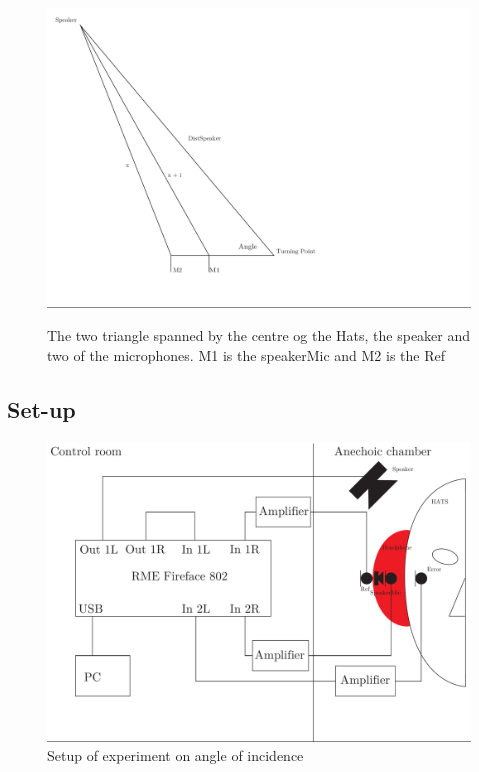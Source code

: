 \begin{figure}
	\includegraphics[width=\textwidth]{../Journal/Experiments/AngleOfIncidence/TriangleCalculation.pdf}
	\label{Fig:AngleOfIcidenceTriangleCalculation}
	\caption{The two triangle spanned by the centre og the Hats, the speaker and two of the microphones. M1 is the speakerMic and M2 is the Ref}
\end{figure}  


\subsection{Set-up}
\begin{figure}[H]
	\includegraphics[width=\textwidth]{../Journal/Experiments/AngleOfIncidence/AngleOfIncidenceSetup.pdf}
	\caption{Setup of experiment on angle of incidence}
	\label{Fig:AngleOfIncidenceSetup}
\end{figure}

